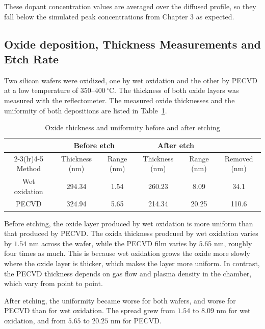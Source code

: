 These dopant concentration values are averaged over the diffused profile, so they fall below the simulated peak concentrations from Chapter 3 as expected.


\subsection{Oxide deposition, Thickness Measurements and Etch Rate}
Two silicon wafers were oxidized, one by wet oxidation and the other by PECVD at a low temperature of $350$–$400\,^\circ$C. The thickness of both oxide layers was measured with the reflectometer. The measured oxide thicknesses and the uniformity of both depositions are listed in Table~\ref{tab:ch4-oxide}.

\begin{table}[htbp]
  \centering
  \caption{Oxide thickness and uniformity before and after etching}
  \label{tab:ch4-oxide}
  \begin{tabular}{cccccc}
    \toprule
     & \multicolumn{2}{c}{Before etch} & \multicolumn{2}{c}{After etch} & \\
    \cmidrule(lr){2-3}\cmidrule(lr){4-5}
    Method & Thickness (nm) & Range (nm) & Thickness (nm) & Range (nm) & Removed (nm) \\
    \midrule
    Wet oxidation & 294.34 & 1.54 & 260.23 &  8.09 &  34.1 \\
    PECVD         & 324.94 & 5.65 & 214.34 & 20.25 & 110.6 \\
    \bottomrule
  \end{tabular}
\end{table}

Before etching, the oxide layer produced by wet oxidation is more uniform than that produced by PECVD. The oxida thickness prodcued by wet oxidation varies by $1.54$ nm across the wafer, while the PECVD film varies by $5.65$ nm, roughly four times as much. This is because wet oxidation grows the oxide more slowly where the oxide layer is thicker, which makes the layer more uniform. In contrast, the PECVD thickness depends on gas flow and plasma density in the chamber, which vary from point to point.

After etching, the uniformity became worse for both wafers, and worse for PECVD than for wet oxidation. The spread grew from $1.54$ to $8.09$ nm for wet oxidation, and from $5.65$ to $20.25$ nm for PECVD.

